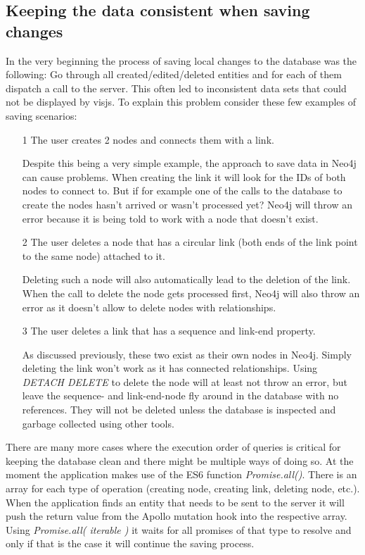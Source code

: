 \subsection{Keeping the data consistent when saving changes}
In the very beginning the process of saving local changes to the database was the following: Go through all created/edited/deleted entities and for each of them dispatch a call to the server. This often led to inconsistent data sets that could not be displayed by visjs. To explain this problem consider these few examples of saving scenarios:
\begin{itemize}
\item[1] The user creates 2 nodes and connects them with a link.

Despite this being a very simple example, the approach to save data in Neo4j can cause problems. When creating the link it will look for the IDs of both nodes to connect to. But if for example one of the calls to the database to create the nodes hasn't arrived or wasn't processed yet? Neo4j will throw an error because it is being told to work with a node that doesn't exist.

\item[2] The user deletes a node that has a circular link (both ends of the link point to the same node) attached to it.

Deleting such a node will also automatically lead to the deletion of the link. When the call to delete the node gets processed first, Neo4j will also throw an error as it doesn't allow to delete nodes with relationships.

\item[3] The user deletes a link that has a sequence and link-end property.

As discussed previously, these two exist as their own nodes in Neo4j. Simply deleting the link won't work as it has connected relationships. Using \emph{DETACH DELETE} to delete the node will at least not throw an error, but leave the sequence- and link-end-node fly around in the database with no references. They will not be deleted unless the database is inspected and garbage collected using other tools.
\end{itemize}

There are many more cases where the execution order of queries is critical for keeping the database clean and there might be multiple ways of doing so. At the moment the application makes use of the ES6 function \emph{Promise.all()}. There is an array for each type of operation (creating node, creating link, deleting node, etc.). When the application finds an entity that needs to be sent to the server it will push the return value from the Apollo mutation hook into the respective array. Using \emph{Promise.all( iterable )} it waits for all promises of that type to resolve and only if that is the case it will continue the saving process.

